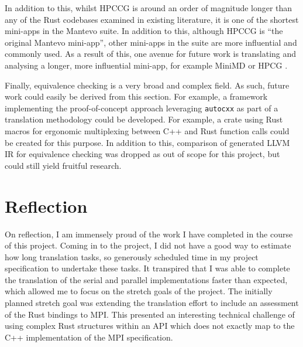 In addition to this, whilst HPCCG is around an order of magnitude longer than any of the Rust codebases examined in existing literature, it is one of the shortest mini-apps in the Mantevo suite. In addition to this, although HPCCG is ``the original Mantevo mini-app'', other mini-apps in the suite are more influential and commonly used. As a result of this, one avenue for future work is translating and analysing a longer, more influential mini-app, for example MiniMD \cite{osti_1231191} or HPCG \cite{dongarra2015hpcg}.

Finally, equivalence checking is a very broad and complex field. As such, future work could easily be derived from this section. For example, a framework implementing the proof-of-concept approach leveraging \texttt{autocxx} as part of a translation methodology could be developed. For example, a crate using Rust macros for ergonomic multiplexing between C++ and Rust function calls could be created for this purpose. In addition to this, comparison of generated LLVM IR for equivalence checking was dropped as out of scope for this project, but could still yield fruitful research.



\section{Reflection}
\label{sec:reflection}

On reflection, I am immensely proud of the work I have completed in the course of this project. Coming in to the project, I did not have a good way to estimate how long translation tasks, so generously scheduled time in my project specification to undertake these tasks. It transpired that I was able to complete the translation of the serial and parallel implementations faster than expected, which allowed me to focus on the stretch goals of the project. The initially planned stretch goal was extending the translation effort to include an assessment of the Rust bindings to MPI. This presented an interesting technical challenge of using complex Rust structures within an API which does not exactly map to the C++ implementation of the MPI specification.


